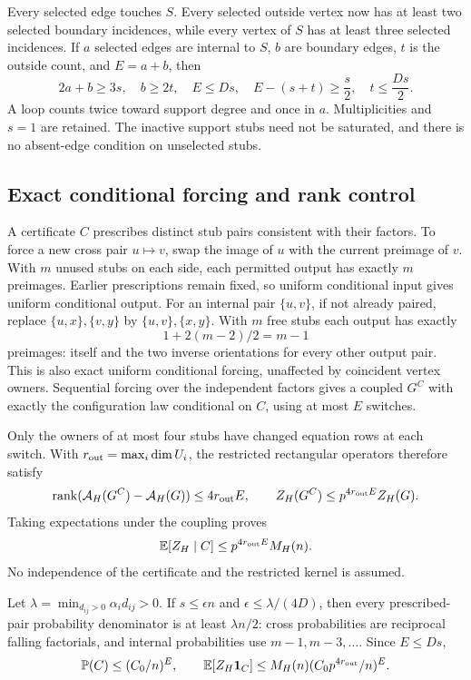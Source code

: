 \documentclass[11pt]{article}
\newcommand{\E}{\mathbb E}
\newcommand{\Prob}{\mathbb P}
\newcommand{\one}{\mathbf 1}
\newcommand{\rank}{\operatorname{rank}}
\begin{document}
Every selected edge touches $S$. Every selected outside vertex now has at least two selected boundary incidences, while every vertex of $S$ has at least three selected incidences. If $a$ selected edges are internal to $S$, $b$ are boundary edges, $t$ is the outside count, and $E=a+b$, then
\begin{equation}\label{eq:excess}
 2a+b\ge3s,\quad b\ge2t,\quad E\le Ds,\quad
 E-(s+t)\ge\frac{s}{2},\quad t\le\frac{Ds}{2}.
\end{equation}
A loop counts twice toward support degree and once in $a$. Multiplicities and $s=1$ are retained. The inactive support stubs need not be saturated, and there is no absent-edge condition on unselected stubs.

\subsection*{Exact conditional forcing and rank control}
A certificate $C$ prescribes distinct stub pairs consistent with their factors. To force a new cross pair $u\mapsto v$, swap the image of $u$ with the current preimage of $v$. With $m$ unused stubs on each side, each permitted output has exactly $m$ preimages. Earlier prescriptions remain fixed, so uniform conditional input gives uniform conditional output. For an internal pair $\{u,v\}$, if not already paired, replace $\{u,x\},\{v,y\}$ by $\{u,v\},\{x,y\}$. With $m$ free stubs each output has exactly
\[
 1+2(m-2)/2=m-1
\]
preimages: itself and the two inverse orientations for every other output pair. This is also exact uniform conditional forcing, unaffected by coincident vertex owners. Sequential forcing over the independent factors gives a coupled $G^C$ with exactly the configuration law conditional on $C$, using at most $E$ switches.

Only the owners of at most four stubs have changed equation rows at each switch. With $r_{\rm out}=\max_i\dim U_i$, the restricted rectangular operators therefore satisfy
\[
 \rank(\mathcal A_H(G^C)-\mathcal A_H(G))\le4r_{\rm out}E,
 \qquad Z_H(G^C)\le p^{4r_{\rm out}E}Z_H(G).
\]
Taking expectations under the coupling proves
\begin{equation}\label{eq:conditional}
 \E[Z_H\mid C]\le p^{4r_{\rm out}E}M_H(n).
\end{equation}
No independence of the certificate and the restricted kernel is assumed.

Let $\lambda=\min_{d_{ij}>0}\alpha_id_{ij}>0$. If $s\le\epsilon n$ and $\epsilon\le\lambda/(4D)$, then every prescribed-pair probability denominator is at least $\lambda n/2$: cross probabilities are reciprocal falling factorials, and internal probabilities use $m-1,m-3,\ldots$. Since $E\le Ds$,
\begin{equation}\label{eq:weighted}
 \Prob(C)\le(C_0/n)^E,\qquad
 \E[Z_H\one_C]\le M_H(n)(C_0p^{4r_{\rm out}}/n)^E.
\end{equation}
\end{document}
